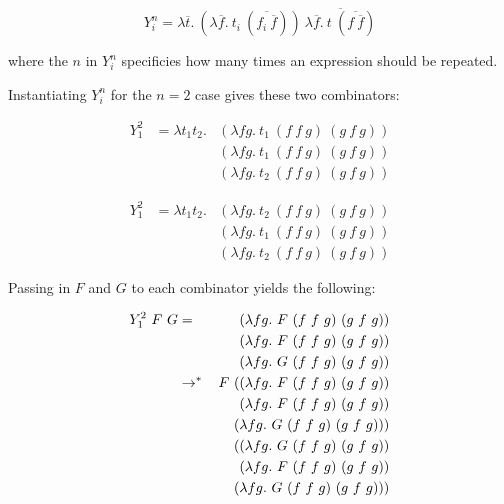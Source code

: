 \documentclass[10pt]{article}
\newcommand{\stepsTo}{\rightarrow}
\newcommand{\multiStepsTo}{\stepsTo^*}
\begin{document}
$$Y^n_i= \lambda \overline{t}.
    ~(\lambda \overline{f}.~t_i~(\overline{f_i~\overline{f}}))
    ~\overline{\lambda \overline{f}.~t~(\overline{f~\overline{f}})} $$

where the $n$ in $Y^n_i$ specificies how many times an expression should be
repeated.

Instantiating $Y^n_i$ for the $n = 2$ case gives these two combinators:

\begin{eqnarray*}
    Y^2_1 & = \lambda t_1 t_2 . & (\lambda f g.~t_1~(f~f~g)~(g~f~g)) \\
          &                     & (\lambda f g.~t_1~(f~f~g)~(g~f~g)) \\
          &                     & (\lambda f g.~t_2~(f~f~g)~(g~f~g))
\end{eqnarray*}

\begin{eqnarray*}
    Y^2_1 & = \lambda t_1 t_2 . & (\lambda f g .~t_2~(f~f~g)~(g~f~g)) \\
          &                     & (\lambda f g .~t_1~(f~f~g)~(g~f~g)) \\
          &                     & (\lambda f g .~t_2~(f~f~g)~(g~f~g))
\end{eqnarray*}

Passing in $F$ and $G$ to each combinator yields the following:

\begin{eqnarray*}
    Y^2_1~F~G & =             & (\lambda f g .~F~(f~f~g)~(g~f~g)) \\
              &               & (\lambda f g .~F~(f~f~g)~(g~f~g)) \\
              &               & (\lambda f g .~G~(f~f~g)~(g~f~g)) \\
              & \multiStepsTo & F~((\lambda f g .~F~(f~f~g)~(g~f~g)) \\
              &               & \hspace{.45cm}(\lambda f g .~F~(f~f~g)~(g~f~g)) \\
              &               & \hspace{.45cm}(\lambda f g .~G~(f~f~g)~(g~f~g))) \\
              &               & \hspace{.35cm}((\lambda f g .~G~(f~f~g)~(g~f~g)) \\
              &               & \hspace{.45cm}(\lambda f g .~F~(f~f~g)~(g~f~g)) \\
              &               & \hspace{.45cm}(\lambda f g .~G~(f~f~g)~(g~f~g)))
\end{eqnarray*}
\end{document}
